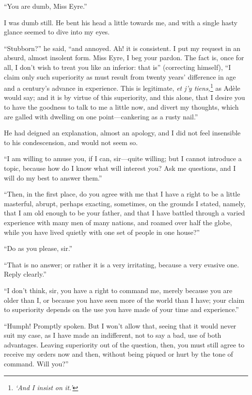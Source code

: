 \enquote{You are dumb, Miss Eyre.}

I was dumb still. He bent his head a little towards me, and with a
single hasty glance seemed to dive into my eyes.

\enquote{Stubborn?} he said, \enquote{and annoyed. Ah! it is
	consistent. I put my request in an absurd, almost insolent form. Miss
	Eyre, I beg your pardon. The fact is, once for all, I don't wish to
	treat you like an inferior: that is} (correcting himself), \enquote{I claim
	only such superiority as must result from twenty years' difference in
	age and a century's advance in experience. This is legitimate, \emph{\foreignlanguage{french}{et
			j'y tiens,}}\footnote{\emph{\enquote{And I insist on it.}}}
	as Adèle would say; and it is by virtue of this superiority,
	and this alone, that I desire you to have the goodness to talk to me a
	little now, and divert my thoughts, which are galled with dwelling on
	one point---cankering as a rusty nail.}

He had deigned an explanation, almost an apology, and I did not feel
insensible to his condescension, and would not seem so.

\enquote{I am willing to amuse you, if I can, sir---quite willing; but I
	cannot introduce a topic, because how do I know what will interest you?
	Ask me questions, and I will do my best to answer them.}

\enquote{Then, in the first place, do you agree with me that I have a
	right to be a little masterful, abrupt, perhaps exacting, sometimes, on
	the grounds I stated, namely, that I am old enough to be your father,
	and that I have battled through a varied experience with many men of
	many nations, and roamed over half the globe, while you have lived
	quietly with one set of people in one house?}

\enquote{Do as you please, sir.}

\enquote{That is no answer; or rather it is a very irritating, because a
	very evasive one. Reply clearly.}

\enquote{I don't think, sir, you have a right to command me, merely
	because you are older than I, or because you have seen more of the world
	than I have; your claim to superiority depends on the use you have made
	of your time and experience.}

\enquote{Humph! Promptly spoken. But I won't allow that, seeing that
	it would never suit my case, as I have made an indifferent, not to say a
	bad, use of both advantages. Leaving superiority out of the question,
	then, you must still agree to receive my orders now and then, without
	being piqued or hurt by the tone of command. Will you?}

